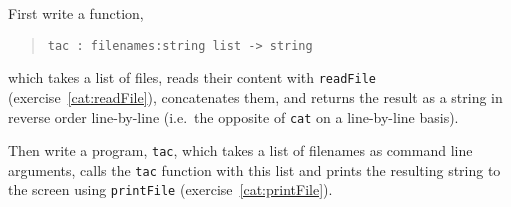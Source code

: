 First write a function,
\begin{quote}
  \mbox{\lstinline!tac : filenames:string list -> string!}
\end{quote}
which takes a list of files, reads their content with
\lstinline{readFile} (exercise~\ref{cat:readFile}), concatenates them,
and returns the result as a string in reverse order line-by-line
(i.e.\ the opposite of \lstinline{cat} on a line-by-line basis).

Then write a program, \lstinline[language=console]{tac}, which takes a
list of filenames as command line arguments, calls the \lstinline{tac}
function with this list and prints the resulting string to the screen
using \lstinline{printFile} (exercise~\ref{cat:printFile}).
